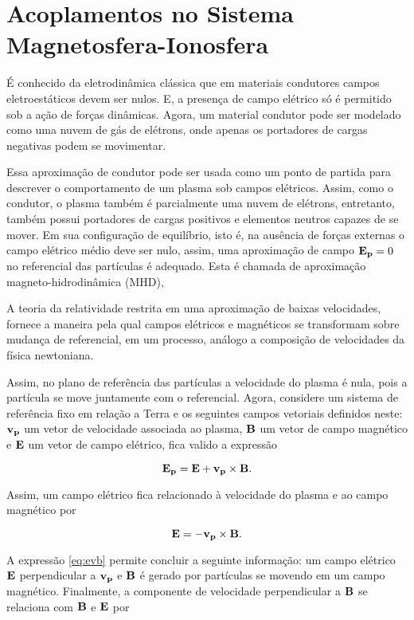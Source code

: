 \section{Acoplamentos no Sistema Magnetosfera-Ionosfera}

É conhecido da eletrodinâmica clássica que em materiais condutores campos eletroestáticos devem ser nulos. E, a presença de campo elétrico só é permitido sob a ação de forças dinâmicas. Agora, um material condutor pode ser modelado como uma nuvem de gás de elétrons, onde apenas os portadores de cargas negativas podem se movimentar.

Essa aproximação de condutor pode ser usada como um ponto de partida para descrever o comportamento de um plasma sob campos elétricos. Assim, como o condutor, o plasma também é parcialmente uma nuvem de elétrons, entretanto, também possui portadores de cargas positivos e elementos neutros capazes de se mover. Em sua configuração de equilíbrio, isto é, na ausência de forças externas o campo elétrico médio deve ser nulo, assim, uma aproximação de campo ${\bf E_p}=0$ no referencial das partículas é adequado. Esta é chamada de aproximação magneto-hidrodinâmica (MHD), \cite{ROEDERER:1979} 

A teoria da relatividade restrita em uma aproximação de baixas velocidades, fornece a maneira pela qual campos elétricos e magnéticos se transformam sobre mudança de referencial, em um processo, análogo a composição de velocidades da física newtoniana.

Assim, no plano de referência das partículas a velocidade do plasma é nula, pois a partícula se move juntamente com o referencial. Agora, considere um sistema de referência fixo em relação a Terra e os seguintes campos vetoriais definidos neste: ${\bf v_p}$ um vetor de velocidade associada ao plasma, ${\bf B}$ um vetor de campo magnético e ${\bf E}$ um vetor de campo elétrico, fica valido a expressão

\begin{equation}
{\bf E_p}= {\bf E}+{\bf v_p}\times{\bf B}\mbox{.}
\end{equation}

Assim, um campo elétrico fica relacionado à velocidade do plasma e ao campo magnético por

\begin{equation}\label{eq:evb}
{\bf E}=-{\bf v_p}\times{\bf B}\mbox{.}
\end{equation}

A expressão \eqref{eq:evb} permite concluir a seguinte informação: um campo elétrico ${\bf E}$ perpendicular a ${\bf v_p}$ e ${\bf B}$ é gerado por partículas se movendo em um campo magnético. Finalmente, a componente de velocidade perpendicular a ${\bf B}$ se relaciona com ${\bf B}$ e ${\bf E}$ por

